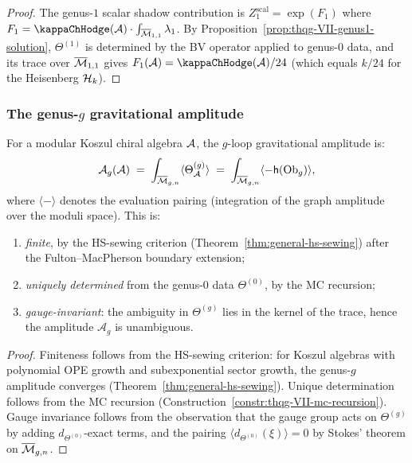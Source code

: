 \begin{proof}
The genus-$1$ scalar shadow contribution is
$Z_1^{\mathrm{scal}} = \exp(F_1)$ where
$F_1 = \kappaChHodge(\cA) \cdot
\int_{\overline{\cM}_{1,1}} \lambda_1$. By
Proposition~\ref{prop:thqg-VII-genus1-solution},
$\Theta^{(1)}$ is determined by the BV operator applied to
genus-$0$ data, and its trace over $\overline{\mathcal{M}}_{1,1}$
gives \(F_1(\cA)=\kappaChHodge(\cA)/24\)
(which equals \(k/24\) for the Heisenberg \(\mathcal{H}_k\)).
\end{proof}

\subsubsection{The genus-$g$ gravitational amplitude}

\begin{theorem}
\label{thm:thqg-VII-g-loop-amplitude}
For a modular Koszul chiral algebra $\mathcal{A}$, the $g$-loop
gravitational amplitude is:
\begin{equation}%
\mathcal{A}_g(\cA)
\;=\;
\int_{\overline{\cM}_{g,n}}
\langle \Theta^{(g)}_\cA \rangle
\;=\;
\int_{\overline{\cM}_{g,n}}
\langle -\hCont(\Ob_g) \rangle,
\end{equation}
where $\langle - \rangle$ denotes the evaluation pairing
\textup{(}integration of the graph amplitude over the
moduli space\textup{)}. This is:
\begin{enumerate}[label=\textup{(\roman*)}]
\item \emph{finite}, by the HS-sewing criterion
 \textup{(}Theorem~\textup{\ref{thm:general-hs-sewing}}) after the
 Fulton--MacPherson boundary extension;
\item \emph{uniquely determined} from the genus-$0$ data
 $\Theta^{(0)}$, by the MC recursion;
\item \emph{gauge-invariant}: the ambiguity in $\Theta^{(g)}$
 lies in the kernel of the trace, hence the amplitude
 $\mathcal{A}_g$ is unambiguous.
\end{enumerate}
\end{theorem}

\begin{proof}
Finiteness follows from the HS-sewing criterion: for Koszul
algebras with polynomial OPE growth and subexponential sector
growth, the genus-$g$ amplitude converges
(Theorem~\ref{thm:general-hs-sewing}). Unique determination
follows from the MC recursion
(Construction~\ref{constr:thqg-VII-mc-recursion}). Gauge
invariance follows from the observation that the gauge
group acts on $\Theta^{(g)}$ by adding
$d_{\Theta^{(0)}}$-exact terms, and the pairing
$\langle d_{\Theta^{(0)}}(\xi) \rangle = 0$ by Stokes'
theorem on $\overline{\mathcal{M}}_{g,n}$.
\end{proof}

